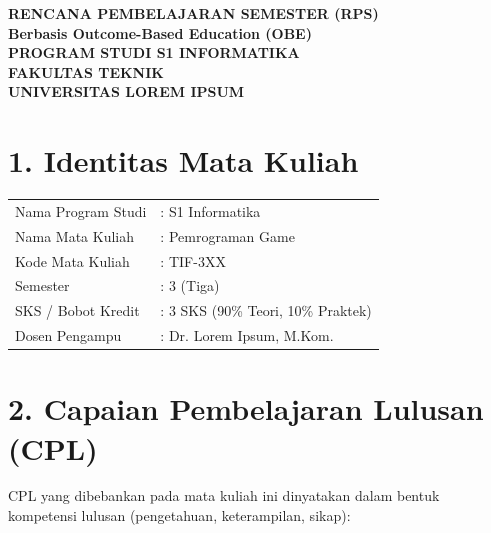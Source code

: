 \documentclass[12pt,a4paper]{article}
\begin{document}
\begin{center}
\textbf{\Large RENCANA PEMBELAJARAN SEMESTER (RPS)}\\
\textbf{Berbasis Outcome-Based Education (OBE)}\\[0.5cm]
\textbf{PROGRAM STUDI S1 INFORMATIKA}\\
\textbf{FAKULTAS TEKNIK}\\
\textbf{UNIVERSITAS LOREM IPSUM}\\
\end{center}

\vspace{1cm}

\section*{1. Identitas Mata Kuliah}
\begin{tabular}{ll}
Nama Program Studi & : S1 Informatika \\
Nama Mata Kuliah & : Pemrograman Game \\
Kode Mata Kuliah & : TIF-3XX \\
Semester & : 3 (Tiga) \\
SKS / Bobot Kredit & : 3 SKS (90\% Teori, 10\% Praktek) \\
Dosen Pengampu & : Dr. Lorem Ipsum, M.Kom. \\
\end{tabular}

\vspace{0.5cm}

\section*{2. Capaian Pembelajaran Lulusan (CPL)}

CPL yang dibebankan pada mata kuliah ini dinyatakan dalam bentuk kompetensi lulusan (pengetahuan, keterampilan, sikap):
\end{document}
